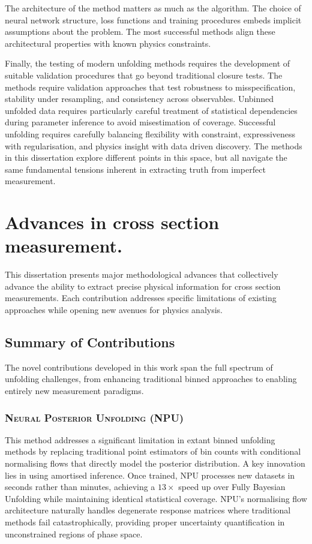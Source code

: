     The architecture of the method matters as much as the algorithm.
    The choice of neural network structure, loss functions and training procedures embeds implicit assumptions about the problem.
    The most successful methods align these architectural properties with known physics constraints.
        
    Finally, the testing of modern unfolding methods requires the development of suitable validation procedures that go beyond traditional closure tests.
    The methods require validation approaches that test robustness to misspecification, stability under resampling, and consistency across observables.
    Unbinned unfolded data requires particularly careful treatment of statistical dependencies during parameter inference to avoid misestimation of coverage.
    Successful unfolding requires carefully balancing flexibility with constraint, expressiveness with regularisation, and physics insight with data driven discovery.
    The methods in this dissertation explore different points in this space, but all navigate the same fundamental tensions inherent in extracting truth from imperfect measurement.
    
\section{Advances in cross section measurement.}
\sectionminitoc
    This dissertation presents major methodological advances that collectively advance the ability to extract precise physical information for cross section measurements.
    Each contribution addresses specific limitations of existing approaches while opening new avenues for physics analysis.
    \subsection{Summary of Contributions}
        The novel contributions developed in this work span the full spectrum of unfolding challenges, from enhancing traditional binned approaches to enabling entirely new measurement paradigms.
        \subsubsection{\textsc{Neural Posterior Unfolding} (NPU)}
            This method addresses a significant limitation in extant binned unfolding methods by replacing traditional point estimators of bin counts with conditional normalising flows that directly model the posterior distribution.
            A key innovation lies in using amortised inference.
            Once trained, NPU processes new datasets in seconds rather than minutes, achieving a \( 13 \times \) speed up over Fully Bayesian Unfolding while maintaining identical statistical coverage.
            NPU's normalising flow architecture naturally handles degenerate response matrices where traditional methods fail catastrophically, providing proper uncertainty quantification in unconstrained regions of phase space.
